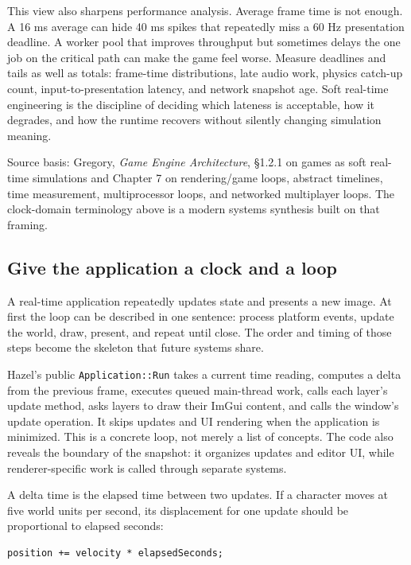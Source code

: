 This view also sharpens performance analysis. Average frame time is not enough. A 16 ms average can hide 40 ms spikes that repeatedly miss a 60 Hz presentation deadline. A worker pool that improves throughput but sometimes delays the one job on the critical path can make the game feel worse. Measure deadlines and tails as well as totals: frame-time distributions, late audio work, physics catch-up count, input-to-presentation latency, and network snapshot age. Soft real-time engineering is the discipline of deciding which lateness is acceptable, how it degrades, and how the runtime recovers without silently changing simulation meaning.

Source basis: Gregory, \emph{Game Engine Architecture}, §1.2.1 on games as soft real-time simulations and Chapter 7 on rendering/game loops, abstract timelines, time measurement, multiprocessor loops, and networked multiplayer loops. The clock-domain terminology above is a modern systems synthesis built on that framing.

\subsection{Give the application a clock and a loop}\label{05-engine-i-ch013-give-the-application-a-clock-and-a-loop}

A real-time application repeatedly updates state and presents a new image. At first the loop can be described in one sentence: process platform events, update the world, draw, present, and repeat until close. The order and timing of those steps become the skeleton that future systems share.

Hazel's public \texttt{Application::Run} takes a current time reading, computes a delta from the previous frame, executes queued main-thread work, calls each layer's update method, asks layers to draw their ImGui content, and calls the window's update operation. It skips updates and UI rendering when the application is minimized. This is a concrete loop, not merely a list of concepts. The code also reveals the boundary of the snapshot: it organizes updates and editor UI, while renderer-specific work is called through separate systems.

A delta time is the elapsed time between two updates. If a character moves at five world units per second, its displacement for one update should be proportional to elapsed seconds:

\begin{verbatim}
position += velocity * elapsedSeconds;
\end{verbatim}

